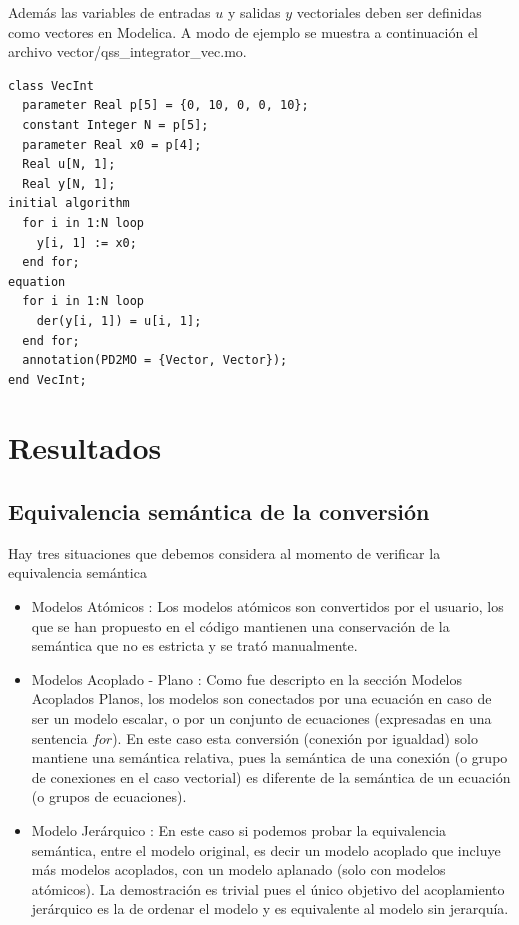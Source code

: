 \documentclass[a4paper,	11pt]{report}
\begin{document}
Además las variables de entradas $u$ y salidas $y$ vectoriales deben ser definidas como vectores en Modelica. A modo de ejemplo se muestra a continuación el archivo vector/qss\_integrator\_vec.mo.


\begin{verbatim}
class VecInt
  parameter Real p[5] = {0, 10, 0, 0, 10};
  constant Integer N = p[5];
  parameter Real x0 = p[4];
  Real u[N, 1];
  Real y[N, 1];
initial algorithm
  for i in 1:N loop
    y[i, 1] := x0;
  end for;
equation
  for i in 1:N loop
    der(y[i, 1]) = u[i, 1];
  end for;
  annotation(PD2MO = {Vector, Vector});
end VecInt;
\end{verbatim}

\chapter{Resultados}

\section{Equivalencia semántica de la conversión}
Hay tres situaciones que debemos considera al momento de verificar la equivalencia semántica
\begin{itemize}
\item Modelos Atómicos : Los modelos atómicos son convertidos por el usuario, los que se han propuesto en el código mantienen una conservación de la semántica que no es estricta y se trató manualmente. 
\item Modelos Acoplado - Plano : Como fue descripto en la sección Modelos Acoplados Planos, los modelos son conectados por una ecuación en caso de ser un modelo escalar, o por un conjunto de ecuaciones (expresadas en una sentencia $for$). En este caso esta conversión (conexión por igualdad) solo mantiene una semántica relativa, pues la semántica de una conexión (o grupo de conexiones en el caso vectorial) es diferente de la semántica de un ecuación (o grupos de ecuaciones).

\item Modelo Jerárquico : En este caso si podemos probar la equivalencia semántica, entre el modelo original, es decir un modelo acoplado que incluye más modelos acoplados, con un modelo aplanado (solo con modelos atómicos). La demostración es trivial pues el único objetivo del acoplamiento jerárquico es la de ordenar el modelo y es equivalente al modelo sin jerarquía. %
\end{itemize}
\end{document}
